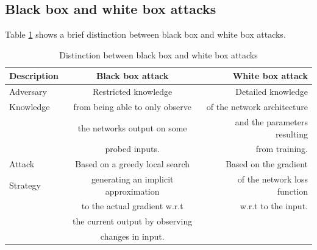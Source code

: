 \documentclass[a4paper]{article}
\begin{document}
\subsection*{Black box and white box attacks}
Table \ref{tab:table1} shows a brief distinction between black box and white box attacks.
\begin{table}[h!]
	\centering
	\begin{tabular}{l|c|r}
		Description & Black box attack & White box attack\\
		\hline
		Adversary & Restricted knowledge & Detailed knowledge \\Knowledge & from being able to only observe & of the network architecture\\&
		 the networks output on some  &
		 and the parameters resulting\\&probed inputs. & from training.\\
		Attack
		& Based on a greedy local search & Based on the gradient\\ Strategy & generating an implicit approximation &  of the network loss function \\&to the actual gradient w.r.t & w.r.t to the input.\\& the current output by observing\\& changes in input.
		 
	\end{tabular}
    \caption{Distinction between black box and white box attacks}
	\label{tab:table1}
\end{table}
\end{document}
